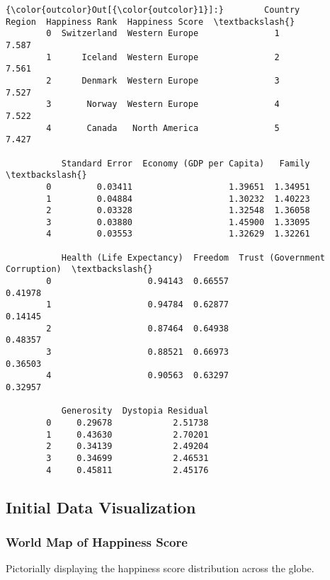 \documentclass[11pt]{article}
\begin{document}
    
    
\begin{Verbatim}[commandchars=\\\{\}]
{\color{outcolor}Out[{\color{outcolor}1}]:}        Country          Region  Happiness Rank  Happiness Score  \textbackslash{}
        0  Switzerland  Western Europe               1            7.587   
        1      Iceland  Western Europe               2            7.561   
        2      Denmark  Western Europe               3            7.527   
        3       Norway  Western Europe               4            7.522   
        4       Canada   North America               5            7.427   
        
           Standard Error  Economy (GDP per Capita)   Family  \textbackslash{}
        0         0.03411                   1.39651  1.34951   
        1         0.04884                   1.30232  1.40223   
        2         0.03328                   1.32548  1.36058   
        3         0.03880                   1.45900  1.33095   
        4         0.03553                   1.32629  1.32261   
        
           Health (Life Expectancy)  Freedom  Trust (Government Corruption)  \textbackslash{}
        0                   0.94143  0.66557                        0.41978   
        1                   0.94784  0.62877                        0.14145   
        2                   0.87464  0.64938                        0.48357   
        3                   0.88521  0.66973                        0.36503   
        4                   0.90563  0.63297                        0.32957   
        
           Generosity  Dystopia Residual  
        0     0.29678            2.51738  
        1     0.43630            2.70201  
        2     0.34139            2.49204  
        3     0.34699            2.46531  
        4     0.45811            2.45176  
\end{Verbatim}
            
    \subsection{Initial Data
Visualization}\label{initial-data-visualization}

\subsubsection{World Map of Happiness
Score}\label{world-map-of-happiness-score}

Pictorially displaying the happiness score distribution across the
globe.
\end{document}
